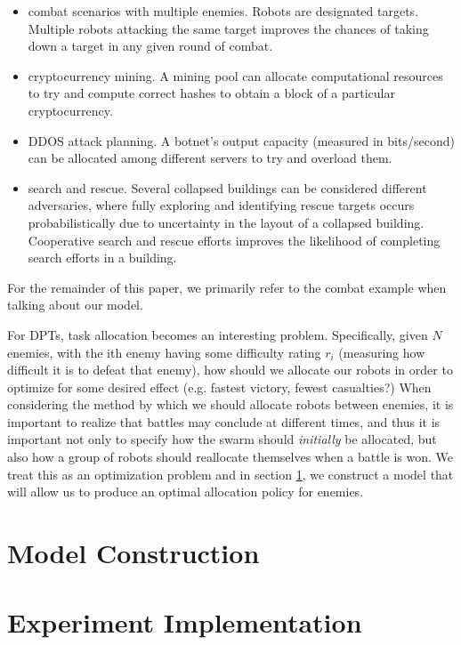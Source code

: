 \documentclass[11pt]{article}
\theoremstyle{definition}
\begin{document}
\begin{itemize}
    \item combat scenarios with multiple enemies.
        Robots are designated targets. Multiple
        robots attacking the same target
        improves the chances of taking down
        a target in any given round of combat.
    \item cryptocurrency mining. A mining pool
        can allocate computational resources to
        try and compute correct hashes to
        obtain a block of a particular
        cryptocurrency.
    \item DDOS attack planning. A botnet's
        output capacity (measured in bits/second)
        can be allocated among different servers
        to try and overload them.
    \item search and rescue. Several collapsed
        buildings can be considered different
        adversaries, where fully exploring
        and identifying rescue targets occurs
        probabilistically due to uncertainty
        in the layout of a collapsed building.
        Cooperative search and rescue efforts improves
        the likelihood of completing search efforts
        in a building.
\end{itemize}

For the remainder of this paper, we primarily
refer to the combat example when talking about
our model.

For DPTs, task allocation becomes an interesting
problem.
Specifically, given $ N $ enemies,
with the ith enemy having some difficulty
rating $ r_i $ (measuring how difficult it is
to defeat that enemy), how should we allocate our robots
in order to optimize for some desired effect
(e.g. fastest victory, fewest casualties?)
When considering the method by which we should allocate
robots between enemies, it is important to realize
that battles may conclude at different times, and
thus it is important not only to specify how the
swarm should \emph{initially} be allocated,
but also how a group of robots should reallocate
themselves when a battle is won. We treat this
as an optimization problem and in section
\ref{sec:model}, we construct a model that
will allow us to produce an optimal allocation
policy for enemies.

\section{Model Construction}
\label{sec:model}

\section{Experiment Implementation}
\label{sec:implementation}
\end{document}
